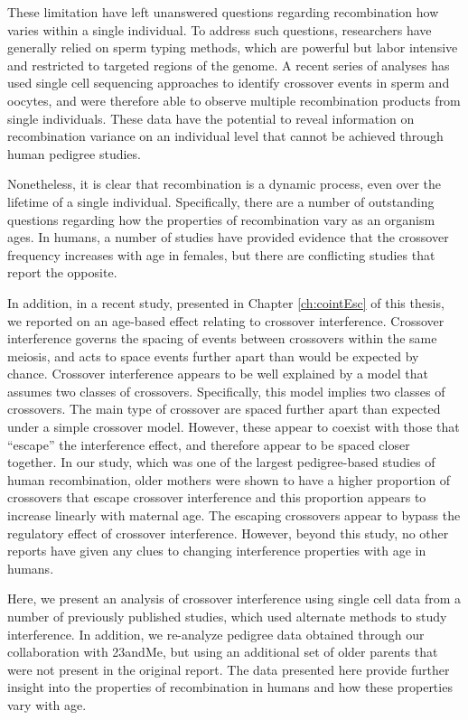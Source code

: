 These limitation have left unanswered questions regarding recombination how varies within a single individual.
To address such questions, researchers have generally relied on sperm typing methods, which are powerful but labor intensive and restricted to targeted regions of the genome\cite{Jeffreys2004}.
A recent series of analyses has used single cell sequencing approaches to identify crossover events in sperm\cite{Wang2012,Lu2012} and oocytes\cite{Hou2013}, and were therefore able to observe multiple recombination products from single individuals.
These data have the potential to reveal information on recombination variance on an individual level that cannot be achieved through human pedigree studies.

Nonetheless, it is clear that recombination is a dynamic process, even over the lifetime of a single individual.
Specifically, there are a number of outstanding questions regarding how the properties of recombination vary as an organism ages.
In humans, a number of studies have provided evidence that the crossover frequency increases with age in females\cite{Kong2004,Martin2015}, but there are conflicting studies that report the opposite\cite{Bleazard2013,Hussin2011}.

In addition, in a recent study, presented in Chapter \ref{ch:cointEsc} of this thesis, we reported on an age-based effect relating to crossover interference.
Crossover interference governs the spacing of events between crossovers within the same meiosis, and acts to space events further apart than would be expected by chance.
Crossover interference appears to be well explained by a model that assumes two classes of crossovers\cite{Broman2000,Housworth2003}.
Specifically, this model implies two classes of crossovers.
The main type of crossover are spaced further apart than expected under a simple crossover model.
However, these appear to coexist with those that ``escape'' the interference effect, and therefore appear to be spaced closer together.
In our study, which was one of the largest pedigree-based studies of human recombination, older mothers were shown to have a higher proportion of crossovers that escape crossover interference and this proportion appears to increase linearly with maternal age\cite{Campbell2015}.
The escaping crossovers appear to bypass the regulatory effect of crossover interference.
However, beyond this study, no other reports have given any clues to changing interference properties with age in humans.

Here, we present an analysis of crossover interference using single cell data from a number of previously published studies, which used alternate methods to study interference.
In addition, we re-analyze pedigree data obtained through our collaboration with 23andMe, but using an additional set of older parents that were not present in the original report.
The data presented here provide further insight into the properties of recombination in humans and how these properties vary with age.



